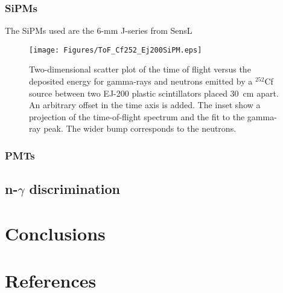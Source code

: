 \documentclass[preprint,3p,twocolumn]{elsarticle}
\begin{document}
\subsubsection{SiPMs}
The SiPMs used are the  6-mm J-series from SensL\textsuperscript{\textregistered}




\begin{figure}[hbt]
\centering
\texttt{[image: Figures/ToF\_Cf252\_Ej200SiPM.eps]}
\caption{Two-dimensional scatter plot of the time of flight versus the deposited energy for gamma-rays and neutrons emitted by a $^{252}$Cf source between two EJ-200 plastic scintillators placed 30~cm apart. An arbitrary offset in the time axis is added. The inset show a projection of the time-of-flight spectrum and the fit to the gamma-ray peak. The wider bump corresponds to the neutrons.}
\label{fig:ToF_SiPM}
\end{figure}


\subsubsection{PMTs}

\subsection{n-${\mathit \gamma}$ discrimination}

\section{Conclusions}
\section*{References}
%

\end{document}
